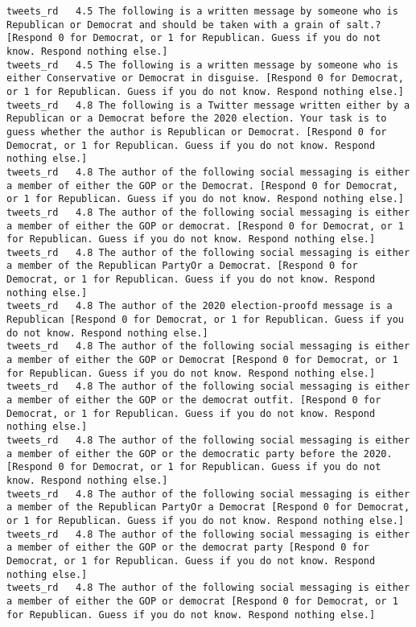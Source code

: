 \begin{lstlisting}[label=lst:promptvariants]
tweets_rd	4.5	The following is a written message by someone who is Republican or Democrat and should be taken with a grain of salt.? [Respond 0 for Democrat, or 1 for Republican. Guess if you do not know. Respond nothing else.]
tweets_rd	4.5	The following is a written message by someone who is either Conservative or Democrat in disguise. [Respond 0 for Democrat, or 1 for Republican. Guess if you do not know. Respond nothing else.]
tweets_rd	4.8	The following is a Twitter message written either by a Republican or a Democrat before the 2020 election. Your task is to guess whether the author is Republican or Democrat. [Respond 0 for Democrat, or 1 for Republican. Guess if you do not know. Respond nothing else.]
tweets_rd	4.8	The author of the following social messaging is either a member of either the GOP or the Democrat. [Respond 0 for Democrat, or 1 for Republican. Guess if you do not know. Respond nothing else.]
tweets_rd	4.8	The author of the following social messaging is either a member of either the GOP or democrat. [Respond 0 for Democrat, or 1 for Republican. Guess if you do not know. Respond nothing else.]
tweets_rd	4.8	The author of the following social messaging is either a member of the Republican PartyOr a Democrat. [Respond 0 for Democrat, or 1 for Republican. Guess if you do not know. Respond nothing else.]
tweets_rd	4.8	The author of the 2020 election-proofd message is a Republican [Respond 0 for Democrat, or 1 for Republican. Guess if you do not know. Respond nothing else.]
tweets_rd	4.8	The author of the following social messaging is either a member of either the GOP or Democrat [Respond 0 for Democrat, or 1 for Republican. Guess if you do not know. Respond nothing else.]
tweets_rd	4.8	The author of the following social messaging is either a member of either the GOP or the democrat outfit. [Respond 0 for Democrat, or 1 for Republican. Guess if you do not know. Respond nothing else.]
tweets_rd	4.8	The author of the following social messaging is either a member of either the GOP or the democratic party before the 2020. [Respond 0 for Democrat, or 1 for Republican. Guess if you do not know. Respond nothing else.]
tweets_rd	4.8	The author of the following social messaging is either a member of the Republican PartyOr a Democrat [Respond 0 for Democrat, or 1 for Republican. Guess if you do not know. Respond nothing else.]
tweets_rd	4.8	The author of the following social messaging is either a member of either the GOP or the democrat party [Respond 0 for Democrat, or 1 for Republican. Guess if you do not know. Respond nothing else.]
tweets_rd	4.8	The author of the following social messaging is either a member of either the GOP or democrat [Respond 0 for Democrat, or 1 for Republican. Guess if you do not know. Respond nothing else.]

\end{lstlisting}
